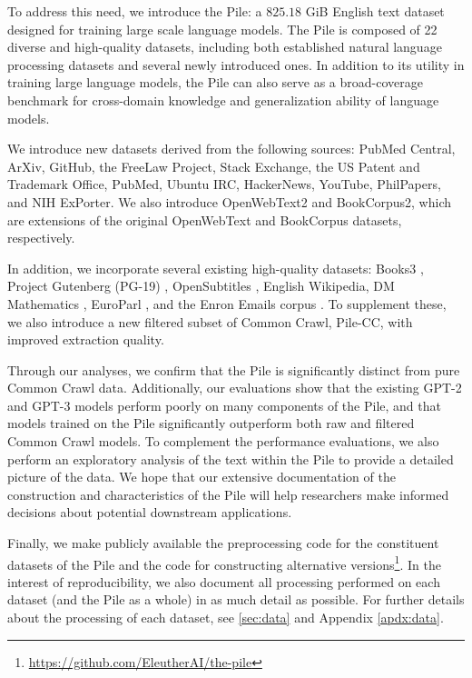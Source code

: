 To address this need, we introduce the Pile: a $825.18$ GiB English text dataset designed for training large scale language models. The Pile is composed of 22 diverse and high-quality datasets, including both established natural language processing datasets and several newly introduced ones. In addition to its utility in training large language models, the Pile can also serve as a broad-coverage benchmark for cross-domain knowledge and generalization ability of language models.

We introduce new datasets derived from the following sources: PubMed Central, ArXiv, GitHub, the FreeLaw Project, Stack Exchange, the US Patent and Trademark Office, PubMed, Ubuntu IRC, HackerNews, YouTube, PhilPapers, and NIH ExPorter. We also introduce OpenWebText2 and BookCorpus2, which are extensions of the original OpenWebText \citep{OpenWeb} and BookCorpus \citep{BookCorpus,BookCorpusCode} datasets, respectively.

In addition, we incorporate several existing high-quality datasets: Books3 \citep{bibliotik}, Project Gutenberg (PG-19) \citep{PG19}, OpenSubtitles \citep{OpenSubtitles}, English Wikipedia, DM Mathematics \citep{dm-mathematics}, EuroParl \citep{EuroParl}, and the Enron Emails corpus \citep{Enron}. To supplement these, we also introduce a new filtered subset of Common Crawl, Pile-CC, with improved extraction quality.

Through our analyses, we confirm that the Pile is significantly distinct from pure Common Crawl data. Additionally, our evaluations show that the existing GPT-2 and GPT-3 models perform poorly on many components of the Pile, and that models trained on the Pile significantly outperform both raw and filtered Common Crawl models. To complement the performance evaluations, we also perform an exploratory analysis of the text within the Pile to provide a detailed picture of the data. We hope that our extensive documentation of the construction and characteristics of the Pile will help researchers make informed decisions about potential downstream applications.

Finally, we make publicly available the preprocessing code for the constituent datasets of the Pile and the code for constructing alternative versions\footnote{\url{https://github.com/EleutherAI/the-pile}}. In the interest of reproducibility, we also document all processing performed on each dataset (and the Pile as a whole) in as much detail as possible. For further details about the processing of each dataset, see \ref{sec:data} and Appendix \ref{apdx:data}.

